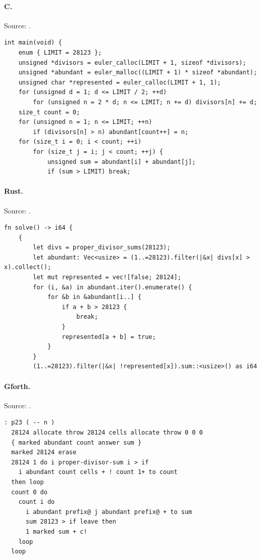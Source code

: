 \paragraph{C.} Source: .
\begin{lstlisting}
int main(void) {
    enum { LIMIT = 28123 };
    unsigned *divisors = euler_calloc(LIMIT + 1, sizeof *divisors);
    unsigned *abundant = euler_malloc((LIMIT + 1) * sizeof *abundant);
    unsigned char *represented = euler_calloc(LIMIT + 1, 1);
    for (unsigned d = 1; d <= LIMIT / 2; ++d)
        for (unsigned n = 2 * d; n <= LIMIT; n += d) divisors[n] += d;
    size_t count = 0;
    for (unsigned n = 1; n <= LIMIT; ++n)
        if (divisors[n] > n) abundant[count++] = n;
    for (size_t i = 0; i < count; ++i)
        for (size_t j = i; j < count; ++j) {
            unsigned sum = abundant[i] + abundant[j];
            if (sum > LIMIT) break;
\end{lstlisting}

\paragraph{Rust.} Source: .
\begin{lstlisting}
fn solve() -> i64 {
    {
        let divs = proper_divisor_sums(28123);
        let abundant: Vec<usize> = (1..=28123).filter(|&x| divs[x] > x).collect();
        let mut represented = vec![false; 28124];
        for (i, &a) in abundant.iter().enumerate() {
            for &b in &abundant[i..] {
                if a + b > 28123 {
                    break;
                }
                represented[a + b] = true;
            }
        }
        (1..=28123).filter(|&x| !represented[x]).sum::<usize>() as i64
\end{lstlisting}

\paragraph{Gforth.} Source: .
\begin{lstlisting}
: p23 ( -- n )
  28124 allocate throw 28124 cells allocate throw 0 0 0
  { marked abundant count answer sum }
  marked 28124 erase
  28124 1 do i proper-divisor-sum i > if
    i abundant count cells + ! count 1+ to count
  then loop
  count 0 do
    count i do
      i abundant prefix@ j abundant prefix@ + to sum
      sum 28123 > if leave then
      1 marked sum + c!
    loop
  loop
\end{lstlisting}

